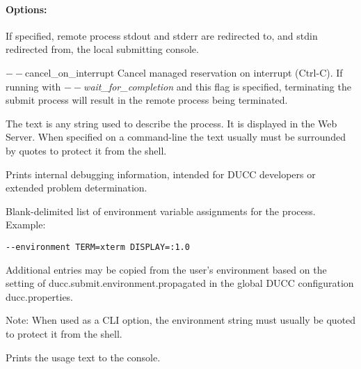     \paragraph{Options:}
    \begin{description}
    
        \item[$--$attach\_console] If specified, remote process stdout and stderr are 
          redirected to, and stdin redirected from, the local submitting console.
          
        \begin{sloppypar}
        \item[$--$cancel\_on\_interrupt ] Cancel managed reservation on interrupt
          (Ctrl-C).  If running with {\em $--$wait\_for\_completion} and this flag is specified,
          terminating the submit process will result in the remote process being terminated.
        \end{sloppypar}
        
        \item[$--$description {[text]}] The text is any string used to describe the process. It is
          displayed in the Web Server. When specified on a command-line the text usually must be
          surrounded by quotes to protect it from the shell.

        \item[$--$debug ] Prints internal debugging information, intended for DUCC developers or
          extended problem determination.

        \item[$--$environment {[env vars]}] Blank-delimited list of environment variable
          assignments for the process. Example:
          \begin{verbatim}
--environment TERM=xterm DISPLAY=:1.0
          \end{verbatim}

          \begin{sloppypar}
            Additional entries may be copied from the user's environment based on the setting of
            ducc.submit.environment.propagated in the global DUCC configuration ducc.properties.
          \end{sloppypar}

          Note: When used as a CLI option, the environment string must usually be
          quoted to protect it from the shell.

        \item[$--$help] Prints the usage text to the console.


\end{description}
